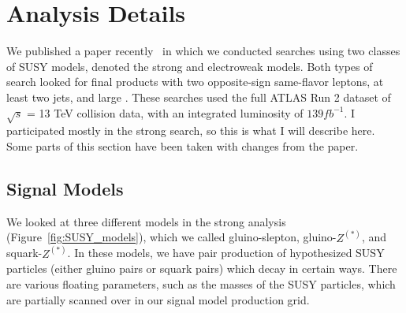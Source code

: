 \chapter{Analysis Details}

We published a paper recently~\cite{SUSY} in which we conducted searches using two classes of SUSY models, denoted the strong and electroweak models. Both types of search looked for final products with two opposite-sign same-flavor leptons, at least two jets, and large \MET. These searches used the full ATLAS Run 2 dataset of $\sqrt{s}$ = 13 TeV collision data, with an integrated luminosity of $139 fb^{-1}$. I participated mostly in the strong search, so this is what I will describe here. Some parts of this section have been taken with changes from the paper.

\section{Signal Models}

We looked at three different models in the strong analysis (Figure~\ref{fig:SUSY_models}), which we called gluino-slepton, gluino-$Z^{(*)}$, and squark-$Z^{(*)}$. In these models, we have pair production of hypothesized SUSY particles (either gluino pairs or squark pairs) which decay in certain ways. There are various floating parameters, such as the masses of the SUSY particles, which are partially scanned over in our signal model production grid.

